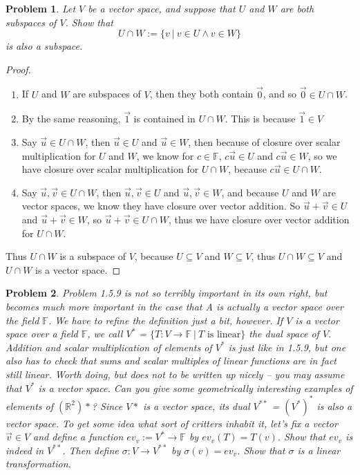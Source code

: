 \documentclass[12pt]{article}   %
\newcommand{\R}{\mathbb{R}} %
\newcommand{\F}{\mathbb{F}} %
\newtheorem{problem}{Problem}
\begin{document}
\begin{problem}
Let $V$ be a vector space, and suppose that $U$ and $W$ are both subspaces of $V$. Show that
\[U\cap W := \{v\ |\ v\in U \land v\in W\}\] is also a subspace.
\end{problem}
\begin{proof}\
\begin{enumerate}[label=(\alph*)]
\item If $U$ and $W$ are subspaces of $V$, then they both contain $\vec{0}$, and so $\vec{0}\in U \cap W$.
\item By the same reasoning, $\vec{1}$ is contained in $U\cap W$. This is because $\vec{1}\in V$
\item Say $\vec{u}\in U\cap W$, then $\vec{u}\in U$ and $\vec{u}\in W$, then because of closure over scalar multiplication for $U$ and $W$, we know for $c\in \F$, $c\vec{u}\in U$ and $c\vec{u}\in W$, so we have closure over scalar multiplication for $U\cap W$, because $c\vec{u}\in U\cap W$.
\item Say $\vec{u},\vec{v}\in U \cap W$, then $\vec{u},\vec{v}\in U$ and $\vec{u},\vec{v}\in W$, and because $U$ and $W$ are vector spaces, we know they have closure over vector addition. So $\vec{u}+\vec{v}\in U$ and $\vec{u}+\vec{v}\in W$, so $\vec{u}+\vec{v}\in U\cap W$, thus we have closure over vector addition for $U\cap W$.
\end{enumerate}
Thus $U\cap W$ is a subspace of $V$, because $U\subseteq V$ and $W \subseteq V$, thus $U\cap W \subseteq V$ and $U\cap W$ is a vector space.
\end{proof}
\begin{problem}
Problem 1.5.9 is not so terribly important in its own right, but becomes much
more important in the case that A is actually a vector space over the field $\F$. We
have to refine the definition just a bit, however. If $V$ is a vector space over a field $\F$,
we call $V^*$ = $\{T: V \to \F\ |\ T \text{ is linear}\}$ the dual space of $V$. Addition and scalar
multiplication of elements of $V^*$ is just like in 1.5.9, but one also has to check
that sums and scalar multiples of linear functions are in fact still linear. Worth
doing, but does not to be written up nicely – you may assume that $V^*$ is a vector space. Can you give some geometrically interesting examples of elements of $(\R^2)*$?
Since $V*$ is a vector space, its dual $V^{**}$ = $(V^*)^*$ is also a vector space. To get some idea what sort of critters inhabit it, let’s fix a vector $\vec{v} \in V$ and define a function $ev_v := V^* \to \F$ by $ev_v(T) = T(v)$. Show that $ev_v$ is indeed in $V^{**}$. Then define $\sigma: V \to V^{**}$ by $\sigma(v) = ev_v$. Show that $\sigma$ is a linear transformation.
\end{problem}
\end{document}

